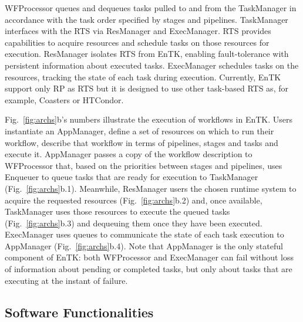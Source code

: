 \documentclass[preprint,12pt, a4paper]{elsarticle}
\begin{document}
WFProcessor queues and dequeues tasks pulled to and from the TaskManager in
accordance with the task order specified by stages and pipelines. TaskManager
interfaces with the RTS via ResManager and ExecManager. RTS provides
capabilities to acquire resources and schedule tasks on those resources for
execution. ResManager isolates RTS from EnTK, enabling fault-tolerance with
persistent information about executed tasks. ExecManager schedules tasks on
the resources, tracking the state of each task during execution. Currently,
EnTK support only RP as RTS but it is designed to use other task-based RTS
as, for example, Coasters or HTCondor.

Fig.~\ref{fig:archs}b's numbers illustrate the execution of workflows in
EnTK\@. Users instantiate an AppManager, %
define a set of resources on which to run their workflow,
describe that workflow in terms of pipelines, stages and tasks
and execute it.
AppManager passes a copy of the workflow description to WFProcessor that,
based on the priorities between stages and pipelines, uses Enqueuer to queue
tasks that are ready for execution to TaskManager (Fig.~\ref{fig:archs}b.1).
Meanwhile, ResManager users the chosen runtime system to acquire the
requested resources (Fig.~\ref{fig:archs}b.2) and, once available,
TaskManager uses those resources to execute the queued tasks
(Fig.~\ref{fig:archs}b.3) and dequeuing them once they have been executed.
ExecManager uses queues to communicate the state of each task execution to
AppManager (Fig.~\ref{fig:archs}b.4). Note that AppManager is the only
stateful component of EnTK: both WFProcessor and ExecManager can fail without
loss of information about pending or completed tasks, but only about tasks
that are executing at the instant of failure.

\subsection{Software Functionalities}\label{ssec:functionalities}

\end{document}
